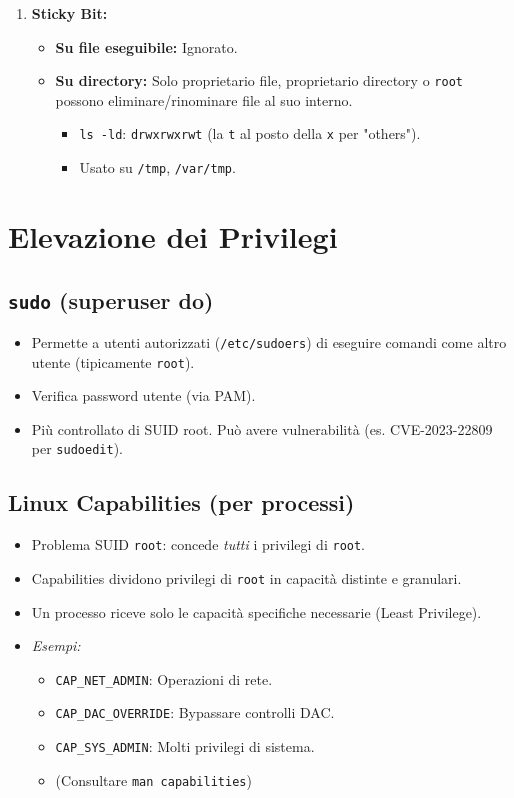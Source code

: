 \documentclass{article}
\begin{document}
\begin{enumerate}
    \item \textbf{Sticky Bit:}
    \begin{itemize}
        \item \textbf{Su file eseguibile:} Ignorato.
        \item \textbf{Su directory:} Solo proprietario file, proprietario directory o \texttt{root} possono eliminare/rinominare file al suo interno.
        \begin{itemize}
            \item \texttt{ls -ld}: \texttt{drwxrwxrwt} (la \texttt{t} al posto della \texttt{x} per "others").
            \item Usato su \texttt{/tmp}, \texttt{/var/tmp}.
        \end{itemize}
    \end{itemize}
\end{enumerate}

\section{Elevazione dei Privilegi}
\subsection{\texttt{sudo} (superuser do)}
\begin{itemize}
    \item Permette a utenti autorizzati (\texttt{/etc/sudoers}) di eseguire comandi come altro utente (tipicamente \texttt{root}).
    \item Verifica password utente (via PAM).
    \item Più controllato di SUID root. Può avere vulnerabilità (es. CVE-2023-22809 per \texttt{sudoedit}).
\end{itemize}

\subsection{Linux Capabilities (per processi)}
\begin{itemize}
    \item Problema SUID \texttt{root}: concede \textit{tutti} i privilegi di \texttt{root}.
    \item Capabilities dividono privilegi di \texttt{root} in capacità distinte e granulari.
    \item Un processo riceve solo le capacità specifiche necessarie (Least Privilege).
    \item \textit{Esempi:}
    \begin{itemize}
        \item \texttt{CAP\_NET\_ADMIN}: Operazioni di rete.
        \item \texttt{CAP\_DAC\_OVERRIDE}: Bypassare controlli DAC.
        \item \texttt{CAP\_SYS\_ADMIN}: Molti privilegi di sistema.
        \item (Consultare \texttt{man capabilities})
    \end{itemize}
\end{itemize}
\end{document}
